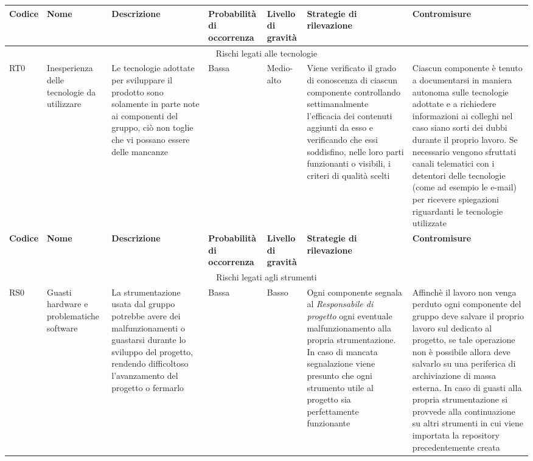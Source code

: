 \documentclass[../PianodiProgetto.tex]{subfiles}
\begin{document}
\setlength\LTleft{-35.5mm}
\raggedleft
	\begin{longtable}{|p{15mm}|p{23.5mm}|p{38mm}|p{22mm}|p{19mm}|p{30mm}|p{30mm}|}
		\hline \textbf{Codice} & \textbf{Nome} & \textbf{Descrizione} & \textbf{Probabilità di occorrenza} & \textbf{Livello di gravità} & \textbf{Strategie di rilevazione} & \textbf{Contromisure} \\
		
		\hline\multicolumn{7}{|c|}{Rischi legati alle tecnologie} \\
		
		\hline RT0 & Inesperienza delle tecnologie da utilizzare & Le tecnologie adottate per sviluppare il prodotto sono solamente in parte note ai componenti del gruppo, ciò non toglie che vi possano essere delle mancanze & Bassa & Medio-alto & Viene verificato il grado di conoscenza di ciascun componente controllando settimanalmente l'efficacia dei contenuti aggiunti da esso e verificando che essi soddisfino, nelle loro parti funzionanti o visibili, i criteri di qualità scelti & Ciascun componente è tenuto a documentarsi in maniera autonoma sulle tecnologie adottate e a richiedere informazioni ai colleghi nel caso siano sorti dei dubbi durante il proprio lavoro. Se necessario vengono sfruttati canali telematici con i detentori delle tecnologie (come ad esempio le e-mail) per ricevere spiegazioni riguardanti le tecnologie utilizzate \\
		\hline

		\newpage
	
		\hline \textbf{Codice} & \textbf{Nome} & \textbf{Descrizione} & \textbf{Probabilità di occorrenza} & \textbf{Livello di gravità} & \textbf{Strategie di rilevazione} & \textbf{Contromisure} \\
		
		\hline\multicolumn{7}{|c|}{Rischi legati agli strumenti} \\
		
		\hline RS0 & Guasti hardware e problematiche software & La strumentazione usata dal gruppo potrebbe avere dei malfunzionamenti o guastarsi durante lo sviluppo del progetto, rendendo difficoltoso l'avanzamento del progetto o fermarlo & Bassa & Basso & Ogni componente segnala al \textit{Responsabile di progetto} ogni eventuale malfunzionamento  alla propria strumentazione. In caso di mancata segnalazione viene presunto che ogni strumento utile al progetto sia perfettamente funzionante & Affinchè il lavoro non venga perduto ogni componente del gruppo deve salvare il proprio lavoro sul \glossario{repository}{Repository} \glossario{GitHub}{GitHub} dedicato al progetto, se tale operazione non è possibile allora deve salvarlo su una periferica di archiviazione di massa esterna. In caso di guasti alla propria strumentazione si provvede alla continuazione su altri strumenti in cui viene importata la repository precedentemente creata \\
		\hline
	

\end{longtable}
\end{document}
